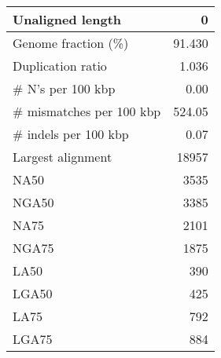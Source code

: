 \documentclass[12pt,a4paper]{article}
\begin{document}
\begin{table}[ht]
\begin{center}
\begin{tabular}{|l*{1}{|r}|}
Unaligned length & 0 \\ \hline
Genome fraction (\%) & 91.430 \\ \hline
Duplication ratio & 1.036 \\ \hline
\# N's per 100 kbp & 0.00 \\ \hline
\# mismatches per 100 kbp & 524.05 \\ \hline
\# indels per 100 kbp & 0.07 \\ \hline
Largest alignment & 18957 \\ \hline
NA50 & 3535 \\ \hline
NGA50 & 3385 \\ \hline
NA75 & 2101 \\ \hline
NGA75 & 1875 \\ \hline
LA50 & 390 \\ \hline
LGA50 & 425 \\ \hline
LA75 & 792 \\ \hline
LGA75 & 884 \\ \hline
\end{tabular}
\end{center}
\end{table}
\end{document}
